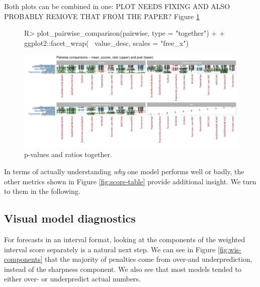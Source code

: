 \documentclass[article]{jss}
\begin{document}
Both plots can be combined in one: PLOT NEEDS FIXING AND ALSO PROBABLY REMOVE THAT FROM THE PAPER? Figure \ref{fig:pairwise-comparison-both}
\begin{figure}[h!]
\centering
\begin{Schunk}
\begin{Sinput}
R> plot_pairwise_comparison(pairwise, type = "together") +
+    ggplot2::facet_wrap(~ value_desc, scales = "free_x") 
\end{Sinput}
\end{Schunk}
\includegraphics{plots/plot-pairwise-plot-pval}
\caption{\label{fig:pairwise-comparison-both} p-values and ratios together.}
\end{figure}

In terms of actually understanding \textit{why} one model performs well or badly, the other metrics shown in Figure \ref{fig:score-table} provide additional insight. We turn to them in the following. 

\subsection{Visual model diagnostics}

For forecasts in an interval format, looking at the components of the weighted interval score separately is a natural next step. We can see in Figure \ref{fig:wis-components} that the majority of penalties come from over-and underprediction, instead of the sharpness component. We also see that most models tended to either over- or underpredict actual numbers.  
\end{document}
